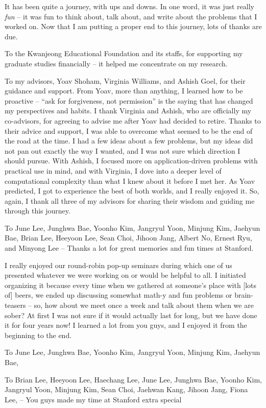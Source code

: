 It has been quite a journey, with ups and downs.
In one word, it was just really {\em fun} -- it was fun to think about, talk about, and write about the problems that I worked on. 
Now that I am putting a proper end to this journey, lots of thanks are due. 

To the Kwanjeong Educational Foundation and its staffs, for supporting my graduate studies financially -- it helped me concentrate on my research.

To my advisors, Yoav Shoham, Virginia Williams, and Ashish Goel, for their guidance and support. From Yoav, more than anything, I learned how to be proactive -- ``ask for forgiveness, not permission'' is the saying that has changed my perspectives and habits. I thank Virginia and Ashish, who are officially my co-advisors, for agreeing to advise me after Yoav had decided to retire. Thanks to their advice and support, I was able to overcome what seemed to be the end of the road at the time. I had a few ideas about a few problems, but my ideas did not pan out exactly the way I wanted, and I was not sure which direction I should pursue. With Ashish, I focused more on application-driven problems with practical use in mind, and with Virginia, I dove into a deeper level of computational complexity than what I knew about it before I met her. As Yoav predicted, I got to experience the best of both worlds, and I really enjoyed it. So, again, I thank all three of my advisors for sharing their wisdom and guiding me through this journey.

To June Lee, Junghwa Bae, Yoonho Kim, Jangryul Yoon, Minjung Kim, Jaehyun Bae, Brian Lee, Heeyoon Lee, Sean Choi, Jihoon Jang, Albert No, Ernest Ryu, and Minyong Lee -- Thanks a lot for great memories and fun times at Stanford. 

I really enjoyed our round-robin pop-up seminars during which one of us presented whatever we were working on or would be helpful to all. I initiated organizing it because every time when we gathered at someone's place with [lots of] beers, we ended up discussing somewhat math-y and fun problems or brain-teasers -- so, how about we meet once a week and talk about them when we are sober? At first I was not sure if it would actually last for long, but we have done it for four years now! I learned a lot from you guys, and I enjoyed it from the beginning to the end. 

To June Lee, Junghwa Bae, Yoonho Kim, Jangryul Yoon, Minjung Kim, Jaehyun Bae, 

To Brian Lee, Heeyoon Lee, Haechang Lee, June Lee, Junghwa Bae, Yoonho Kim, Jangryul Yoon, Minjung Kim, Sean Choi, Jaehwan Kang, Jihoon Jang, Fiona Lee,  -- You guys made my time at Stanford extra special  


